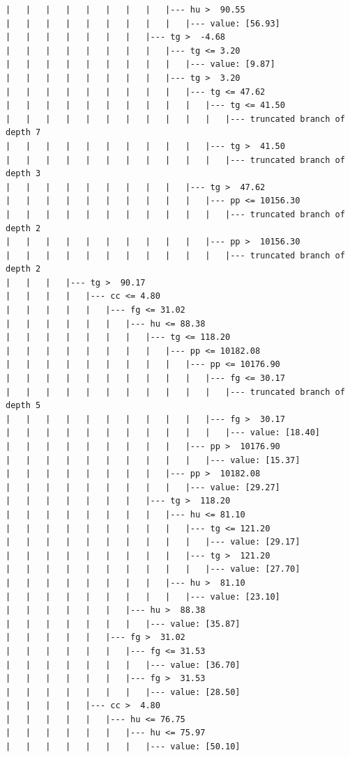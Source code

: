 \documentclass[UTF8, a4paper]{ctexart}
\begin{document}
\begin{lstlisting}
|   |   |   |   |   |   |   |   |--- hu >  90.55
|   |   |   |   |   |   |   |   |   |--- value: [56.93]
|   |   |   |   |   |   |   |--- tg >  -4.68
|   |   |   |   |   |   |   |   |--- tg <= 3.20
|   |   |   |   |   |   |   |   |   |--- value: [9.87]
|   |   |   |   |   |   |   |   |--- tg >  3.20
|   |   |   |   |   |   |   |   |   |--- tg <= 47.62
|   |   |   |   |   |   |   |   |   |   |--- tg <= 41.50
|   |   |   |   |   |   |   |   |   |   |   |--- truncated branch of depth 7
|   |   |   |   |   |   |   |   |   |   |--- tg >  41.50
|   |   |   |   |   |   |   |   |   |   |   |--- truncated branch of depth 3
|   |   |   |   |   |   |   |   |   |--- tg >  47.62
|   |   |   |   |   |   |   |   |   |   |--- pp <= 10156.30
|   |   |   |   |   |   |   |   |   |   |   |--- truncated branch of depth 2
|   |   |   |   |   |   |   |   |   |   |--- pp >  10156.30
|   |   |   |   |   |   |   |   |   |   |   |--- truncated branch of depth 2
|   |   |   |--- tg >  90.17
|   |   |   |   |--- cc <= 4.80
|   |   |   |   |   |--- fg <= 31.02
|   |   |   |   |   |   |--- hu <= 88.38
|   |   |   |   |   |   |   |--- tg <= 118.20
|   |   |   |   |   |   |   |   |--- pp <= 10182.08
|   |   |   |   |   |   |   |   |   |--- pp <= 10176.90
|   |   |   |   |   |   |   |   |   |   |--- fg <= 30.17
|   |   |   |   |   |   |   |   |   |   |   |--- truncated branch of depth 5
|   |   |   |   |   |   |   |   |   |   |--- fg >  30.17
|   |   |   |   |   |   |   |   |   |   |   |--- value: [18.40]
|   |   |   |   |   |   |   |   |   |--- pp >  10176.90
|   |   |   |   |   |   |   |   |   |   |--- value: [15.37]
|   |   |   |   |   |   |   |   |--- pp >  10182.08
|   |   |   |   |   |   |   |   |   |--- value: [29.27]
|   |   |   |   |   |   |   |--- tg >  118.20
|   |   |   |   |   |   |   |   |--- hu <= 81.10
|   |   |   |   |   |   |   |   |   |--- tg <= 121.20
|   |   |   |   |   |   |   |   |   |   |--- value: [29.17]
|   |   |   |   |   |   |   |   |   |--- tg >  121.20
|   |   |   |   |   |   |   |   |   |   |--- value: [27.70]
|   |   |   |   |   |   |   |   |--- hu >  81.10
|   |   |   |   |   |   |   |   |   |--- value: [23.10]
|   |   |   |   |   |   |--- hu >  88.38
|   |   |   |   |   |   |   |--- value: [35.87]
|   |   |   |   |   |--- fg >  31.02
|   |   |   |   |   |   |--- fg <= 31.53
|   |   |   |   |   |   |   |--- value: [36.70]
|   |   |   |   |   |   |--- fg >  31.53
|   |   |   |   |   |   |   |--- value: [28.50]
|   |   |   |   |--- cc >  4.80
|   |   |   |   |   |--- hu <= 76.75
|   |   |   |   |   |   |--- hu <= 75.97
|   |   |   |   |   |   |   |--- value: [50.10]

\end{lstlisting}
\end{document}
